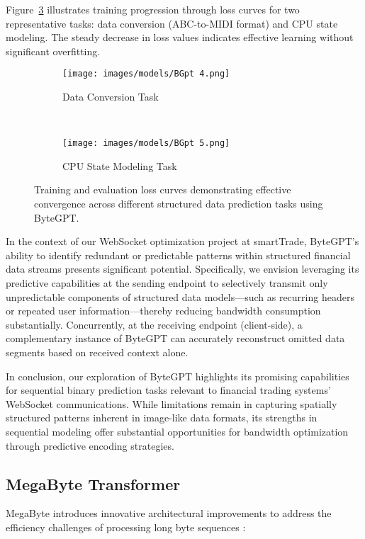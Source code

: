 \documentclass[a4paper, 11pt, twoside, openright]{report}
\begin{document}
Figure~\ref{fig:bgpt_loss_curves} illustrates training progression through loss curves for two representative tasks: data conversion (ABC-to-MIDI format) and CPU state modeling. The steady decrease in loss values indicates effective learning without significant overfitting.

\begin{figure}[h!]
    \centering
    \begin{subfigure}[b]{0.45\textwidth}
        \texttt{[image: images/models/BGpt 4.png]}
        \caption{Data Conversion Task}
        \label{subfig:data_conversion_loss}
    \end{subfigure}
    ~
    \begin{subfigure}[b]{0.45\textwidth}
        \texttt{[image: images/models/BGpt 5.png]}
        \caption{CPU State Modeling Task}
        \label{subfig:cpu_state_loss}
    \end{subfigure}
    \caption{Training and evaluation loss curves demonstrating effective convergence across different structured data prediction tasks using ByteGPT.}
    \label{fig:bgpt_loss_curves}
\end{figure}

In the context of our WebSocket optimization project at smartTrade, ByteGPT's ability to identify redundant or predictable patterns within structured financial data streams presents significant potential. Specifically, we envision leveraging its predictive capabilities at the sending endpoint to selectively transmit only unpredictable components of structured data models—such as recurring headers or repeated user information—thereby reducing bandwidth consumption substantially. Concurrently, at the receiving endpoint (client-side), a complementary instance of ByteGPT can accurately reconstruct omitted data segments based on received context alone.

In conclusion, our exploration of ByteGPT highlights its promising capabilities for sequential binary prediction tasks relevant to financial trading systems' WebSocket communications. While limitations remain in capturing spatially structured patterns inherent in image-like data formats, its strengths in sequential modeling offer substantial opportunities for bandwidth optimization through predictive encoding strategies.

\subsection{MegaByte Transformer}
MegaByte \cite{MegaByte2023} introduces innovative architectural improvements to address the efficiency challenges of processing long byte sequences :
\end{document}
